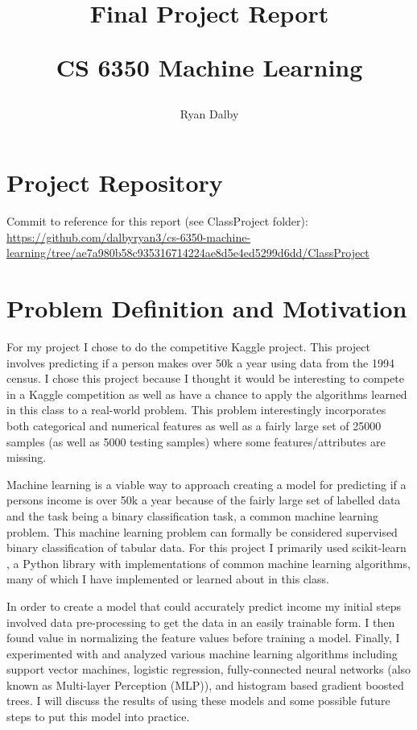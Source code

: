 \documentclass[11pt]{article}
\title{
    Final Project Report

    \large{
    CS 6350 Machine Learning
    }  
    
}
\author{
    Ryan Dalby
}
\date{\displaydate{date}}
\begin{document}
\maketitle

\section*{Project Repository}
Commit to reference for this report (see ClassProject folder): \url{https://github.com/dalbyryan3/cs-6350-machine-learning/tree/ae7a980b58c935316714224ae8d5e4ed5299d6dd/ClassProject}

\section*{Problem Definition and Motivation}

For my project I chose to do the competitive Kaggle project.
This project involves predicting if a person makes over 50k a year using data from the 1994 census. 
I chose this project because I thought it would be interesting to compete in a Kaggle competition as well as have a chance to apply the algorithms learned in this class to a real-world problem.
This problem interestingly incorporates both categorical and numerical features as well as a fairly large set of 25000 samples (as well as 5000 testing samples) where some features/attributes are missing.

Machine learning is a viable way to approach creating a model for predicting if a persons income is over 50k a year because of the fairly large set of labelled data and the task being a binary classification task, a common machine learning problem.
This machine learning problem can formally be considered supervised binary classification of tabular data. 
For this project I primarily used scikit-learn \cite{noauthor_scikit-learn_nodate}, a Python library with implementations of common machine learning algorithms, many of which I have implemented or learned about in this class.

In order to create a model that could accurately predict income my initial steps involved data pre-processing to get the data in an easily trainable form.
I then found value in normalizing the feature values before training a model.
Finally, I experimented with and analyzed various machine learning algorithms including support vector machines, logistic regression, fully-connected neural networks (also known as Multi-layer Perception (MLP)), and histogram based gradient boosted trees.
I will discuss the results of using these models and some possible future steps to put this model into practice.
\end{document}
